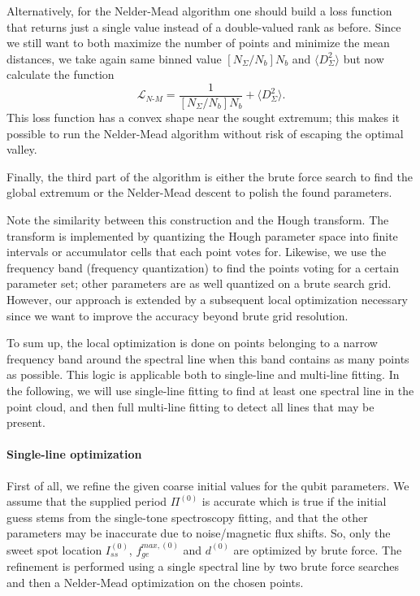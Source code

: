 \documentclass[%
 aip,
 amsmath,amssymb,
 reprint,%
]{revtex4-1}
\begin{document}
Alternatively, for the Nelder-Mead algorithm one should build a loss function that returns just a single value instead of a double-valued rank as before. Since we still want to both maximize the number of points and minimize the mean distances, we take again same binned value $[N_\Sigma/N_b]N_b$ and $\langle D_\Sigma^2 \rangle$ but now calculate the function
\begin{equation}
\mathcal{L}_{N\text{-}M} = \frac{1}{[N_\Sigma/N_b]N_b} + \langle D_\Sigma^2 \rangle.
\end{equation}
This loss function has a convex shape near the sought extremum; this makes it possible to run the Nelder-Mead algorithm without risk of escaping the optimal valley.
  
Finally, the third part of the algorithm is either the brute force search to find the global extremum or the Nelder-Mead descent to polish the found parameters.

Note the similarity between this construction and the Hough transform. The transform is implemented by quantizing the Hough parameter space into finite intervals or accumulator cells that each point votes for. Likewise, we use the frequency band (frequency quantization) to find the points voting for a certain parameter set; other parameters are as well quantized on a brute search grid. However, our approach is extended by a subsequent local optimization necessary since we want to improve the accuracy beyond brute grid resolution.

To sum up, the local optimization is done on points belonging to a narrow frequency band around the spectral line when this band contains as many points as possible. This logic is applicable both to single-line and multi-line fitting. In the following, we will use single-line fitting to find at least one spectral line in the point cloud, and then full multi-line fitting to detect all lines that may be present.


\paragraph{Single-line optimization}

First of all, we refine the given coarse initial values for the qubit parameters. We assume that the supplied period $\Pi^{(0)}$ is accurate which is true if the initial guess stems from the single-tone spectroscopy fitting, and that the other parameters may be inaccurate due to noise/magnetic flux shifts. So, only the sweet spot location $I_{ss}^{(0)}$, $f_{ge}^{max, (0)}$ and $d^{(0)}$ are optimized by brute force. The refinement is performed using a single spectral line by two brute force searches and then a Nelder-Mead optimization on the chosen points.
\end{document}
